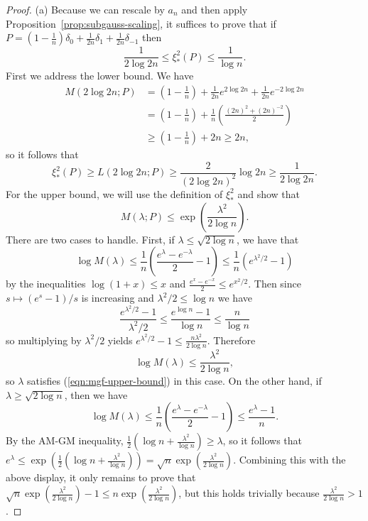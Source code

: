 \documentclass{article}
\theoremstyle{definition}
\newcommand{\1}{\mathbbm{1}}
\begin{document}
\begin{proof}
    (a) Because we can rescale by $a_n$ and then apply Proposition~\ref{prop:subgauss-scaling}, it suffices to prove that if  $P = (1 - \frac1n)\delta_0 + \frac{1}{2n}\delta_{1} + \frac{1}{2n} \delta_{-1}$ then 
    \[
     \frac{1}{2 \log 2n}\leq \xi_*^2(P) \leq \frac{1}{\log n}.
    \]
    First we address the lower bound.  We have \begin{align*}
        M(2 \log 2n; P) &= \left(1 - \frac1n\right) + \frac{1}{2n}e^{2 \log 2n} + \frac{1}{2n}e^{-2 \log 2n} \\
        &= \left(1 - \frac1n\right) + \frac1n\left(\frac{(2n)^2 +(2n)^{-2}}{2}\right) \\
        &\geq \left(1 - \frac1n\right)  + 2n \geq 2n,
    \end{align*}
    so it follows that 
    \[
    \xi_*^2(P) \geq L(2 \log 2n; P) \geq \frac{2}{(2 \log 2n)^2}\log 2n \geq \frac{1}{2\log 2n}.
    \]
    For the upper bound, we will use the definition of $\xi_*^2$ and show that 
    \begin{equation}
        M(\lambda; P) \leq \exp\left(\frac{\lambda^2}{2\log n}\right).
    \label{eqn:mgf-upper-bound}
    \end{equation}
    There are two cases to handle. First, if $\lambda \leq \sqrt{2\log n}$, we have that 
    \[
    \log M(\lambda) \leq \frac{1}{n}\left(\frac{e^{\lambda} - e^{-\lambda}}{2} - 1\right) \leq\frac{1}{n}\left(e^{\lambda^2/2} - 1\right)
    \]
    by the inequalities $\log(1+x)\leq x$ and $\frac{e^x - e^{-x}}{2} \leq e^{x^2/2}$. Then since $s \mapsto (e^s - 1)/s$ is increasing and $\lambda^2/2 \leq \log n$ we have 
    \[
\frac{e^{\lambda^2/2}-1}{\lambda^2/2} \leq  \frac{e^{\log n} - 1}{\log n} \leq \frac{n}{\log n}
    \]
    so multiplying by $\lambda^2/2$ yields $e^{\lambda^2/2} - 1 \leq \frac{n\lambda^2}{2\log n}$. Therefore
    \[
    \log M(\lambda) \leq \frac{\lambda^2}{2 \log n},
    \]
    so $\lambda$ satisfies (\ref{eqn:mgf-upper-bound}) in this case. On the other hand, if $\lambda \geq \sqrt{2 \log n}$, then we have 
    \[
    \log M(\lambda) \leq \frac{1}{n}\left(\frac{e^{\lambda} - e^{-\lambda}}{2} - 1\right)  \leq \frac{e^{\lambda} - 1}{n}.
    \]
    By the AM-GM inequality, $\frac12(\log n + \frac{\lambda^2}{\log n})\geq \lambda$, so it follows that $e^{\lambda } \leq \exp(\frac12(\log n + \frac{\lambda^2}{\log n})) = \sqrt n \exp(\frac{\lambda^2}{2\log n})$. Combining this with the above display, it only remains to prove that $\sqrt n\exp(\frac{\lambda^2}{2\log n}) - 1  \leq n\exp(\frac{\lambda^2}{2\log n})$, but this holds trivially because $\frac{\lambda^2}{2\log n} > 1$. 

\end{proof}
\end{document}
